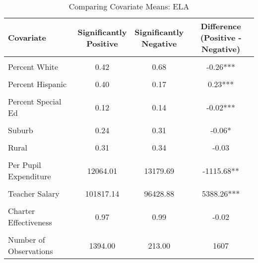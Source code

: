 \begin{table}[!h]
\centering
\caption{\label{tab:cov_means_ela}Comparing Covariate Means: ELA}
\centering
\begin{tabular}[t]{lccc}
\toprule
Covariate & \makecell[c]{Significantly\\Positive} & \makecell[c]{Significantly\\Negative} & \makecell[c]{Difference\\(Positive - Negative)}\\
\midrule
\cellcolor{gray!10}{Log of Enrollment} & \cellcolor{gray!10}{8.20} & \cellcolor{gray!10}{7.74} & \cellcolor{gray!10}{0.47***}\\
Percent White & 0.42 & 0.68 & -0.26***\\
\cellcolor{gray!10}{Percent Black} & \cellcolor{gray!10}{0.07} & \cellcolor{gray!10}{0.11} & \cellcolor{gray!10}{-0.04***}\\
Percent Hispanic & 0.40 & 0.17 & 0.23***\\
\cellcolor{gray!10}{Percent Free/Reduced Lunch} & \cellcolor{gray!10}{0.58} & \cellcolor{gray!10}{0.50} & \cellcolor{gray!10}{0.08***}\\
Percent Special Ed & 0.12 & 0.14 & -0.02***\\
\cellcolor{gray!10}{Urban} & \cellcolor{gray!10}{0.20} & \cellcolor{gray!10}{0.10} & \cellcolor{gray!10}{0.1***}\\
Suburb & 0.24 & 0.31 & -0.06*\\
\cellcolor{gray!10}{Town} & \cellcolor{gray!10}{0.25} & \cellcolor{gray!10}{0.25} & \cellcolor{gray!10}{0}\\
Rural & 0.31 & 0.34 & -0.03\\
\cellcolor{gray!10}{Per Pupil Revenue} & \cellcolor{gray!10}{12258.61} & \cellcolor{gray!10}{13020.99} & \cellcolor{gray!10}{-762.38*}\\
Per Pupil Expenditure & 12064.01 & 13179.69 & -1115.68**\\
\cellcolor{gray!10}{Student-Teacher Ratio} & \cellcolor{gray!10}{18.22} & \cellcolor{gray!10}{16.14} & \cellcolor{gray!10}{2.08***}\\
Teacher Salary & 101817.14 & 96428.88 & 5388.26***\\
\cellcolor{gray!10}{Number of Magnet Schools} & \cellcolor{gray!10}{0.56} & \cellcolor{gray!10}{0.50} & \cellcolor{gray!10}{0.06}\\
Charter Effectiveness & 0.97 & 0.99 & -0.02\\
\cellcolor{gray!10}{Baseline Performance} & \cellcolor{gray!10}{-0.51} & \cellcolor{gray!10}{-0.05} & \cellcolor{gray!10}{-0.46***}\\
\midrule
Number of Observations & 1394.00 & 213.00 & 1607\\
\bottomrule
\end{tabular}
\end{table}
